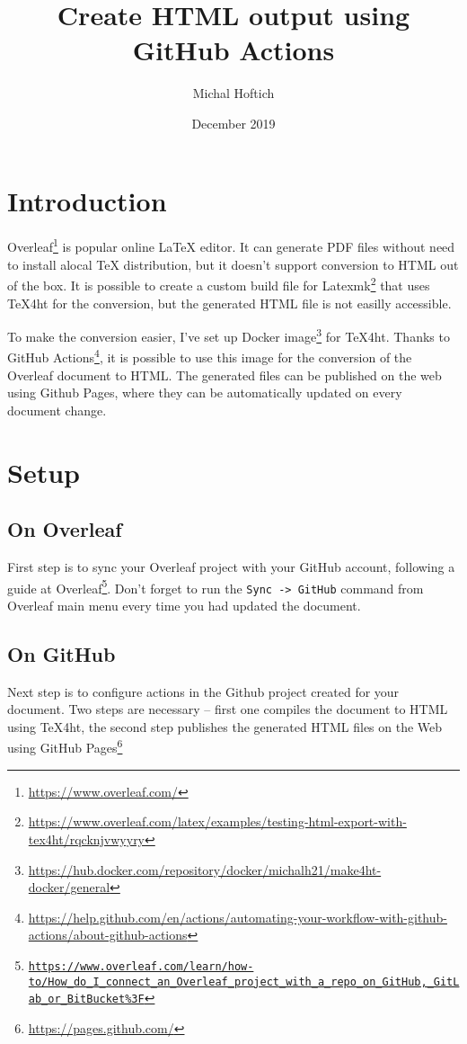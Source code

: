 \documentclass{article}
\title{Create HTML output using GitHub Actions}
\author{Michal Hoftich}
\date{December 2019}
\newcommand{\cmdname}[1]{\texttt{#1}}
\newcommand\footurl[1]{\footnote{\url{#1}}}
\begin{document}
\maketitle

\section{Introduction}

Overleaf\footurl{https://www.overleaf.com/} is popular online \LaTeX{} editor. It can generate PDF files 
without need to install alocal \TeX{} distribution, but it doesn't support conversion to HTML out of the box.
It is possible to create a custom build file for Latexmk\footurl{https://www.overleaf.com/latex/examples/testing-html-export-with-tex4ht/rqcknjvwyyry} 
that uses \TeX4ht for the conversion, but the generated HTML file is not easilly accessible.

To make the conversion easier, I've set up Docker image\footurl{https://hub.docker.com/repository/docker/michalh21/make4ht-docker/general} for \TeX4ht. 
Thanks to GitHub Actions\footurl{https://help.github.com/en/actions/automating-your-workflow-with-github-actions/about-github-actions}, 
it is possible to use this image for the conversion of the Overleaf document to HTML. 
The generated files can be published on the web using Github Pages, where they can be automatically 
updated on every document change.

\section{Setup}

\subsection{On Overleaf}

First step is to sync your Overleaf project with your GitHub account, following a guide at 
Overleaf\footnote{\href{https://www.overleaf.com/learn/how-to/How_do_I_connect_an_Overleaf_project_with_a_repo_on_GitHub,_GitLab_or_BitBucket\%3F}
{\texttt{https://www.overleaf.com/learn/how-to/How\_do\_I\_connect\_an\_Overleaf\_project\_with\_a\allowbreak\_repo\_on\_GitHub,\_GitLab\_or\_BitBucket\%3F}}}. 
Don't forget to run the \cmdname{Sync -> GitHub} command from Overleaf main menu every time you had updated the document.

\subsection{On GitHub}
Next step is to configure actions in the Github project created for your document. Two steps are necessary -- first  one compiles the document to HTML using \TeX4ht, the second step publishes the generated HTML files on the Web using GitHub Pages\footurl{https://pages.github.com/}
\end{document}
